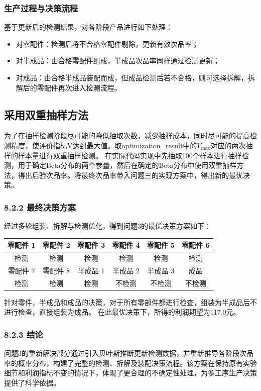 \documentclass{article}
\begin{document}
	\subsubsection*{生产过程与决策流程}
	基于更新后的检测结果，对各阶段产品进行如下处理：
	\begin{itemize}
		\item 对零配件：检测后将不合格零配件剔除，更新有效次品率；
		\item 对半成品：由合格零配件组成，半成品次品率同样通过检测更新；
		\item 对成品：由合格半成品装配而成，但成品检测后若不合格，则可选择拆解，拆解后的零配件再次进入检测流程。
	\end{itemize}
	
	\subsection*{采用双重抽样方法}
	为了在抽样检测阶段尽可能的降低抽取次数，减少抽样成本，同时尽可能的提高检测精度，使评价指标V达到最大值。取optimization\_result中的$V_{\max}$对应的两次抽样的样本量进行双重抽样检测。
	在实际代码实现中先抽取100个样本进行抽样检测，用于确定Beta分布的两个参量，然后在确定的Beta分布中使用双重抽样方法，得出后验次品率。将最终次品率带入问题三的实现方案中，得出新的最优决策。
	
	\subsubsection*{8.2.2 最终决策方案}
	经过多轮组装、拆解与检测优化，得到问题3的最优决策方案如下：
	\begin{center}
		\begin{tabular}{cccccc}
			\toprule
			零配件 1 & 零配件 2 & 零配件 3 & 零配件 4 & 零配件 5 & 零配件 6 \\
			\midrule
			检测 & 检测 & 检测 & 检测 & 检测 & 检测 \\
			\midrule
			零配件 7 & 零配件 8 & 半成品 1 & 半成品 2 & 半成品 3 & 成品 \\
			\midrule
			检测 & 检测 & 检测 & 不检测 & 不检测 & 不检测 \\
			\bottomrule
		\end{tabular}
	\end{center}
	针对零件，半成品和成品的决策，对于所有零部件都进行检查，组装为半成品后不进行检查，直接组装为成品。
	在此最优决策下，所得的利润期望为117.0元。
	
	\subsubsection*{8.2.3 结论}
	问题3的重新解决部分通过引入贝叶斯推断更新检测数据，并重新推导各阶段次品率的概率分布，构建了完整的检测、拆解及装配决策流程。该方案在保持原有实验细节和利润指标不变的情况下，体现了更合理的不确定性处理，为多工序生产决策提供了科学依据。
	
\end{document}
